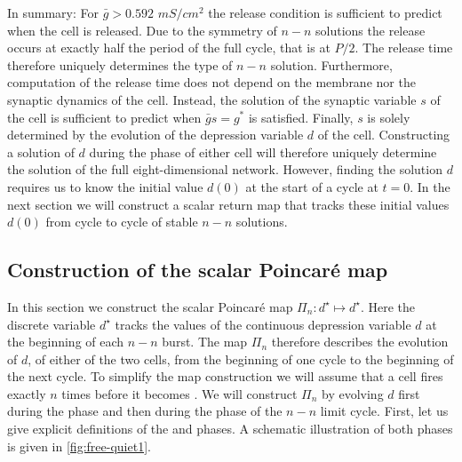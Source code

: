 In summary: For \(\bar g>0.592\) \(\si{mS/cm^{2}}\) the release condition is sufficient to predict when the \quiet{} cell is released.
Due to the symmetry of \(n-n\) solutions the release occurs at exactly half the period of the full cycle, that is at \(P/2\).
The release time therefore uniquely determines the type of \(n-n\) solution.
Furthermore, computation of the release time does not depend on the membrane nor the synaptic dynamics of the \quiet{} cell.
Instead, the solution of the synaptic variable \(s\) of the \free{} cell is sufficient to predict when \(\bar g s=g^{*}\) is satisfied.
Finally, \(s\) is solely determined by the evolution of the depression variable \(d\) of the \free{} cell.
Constructing a solution of \(d\) during the \free{} phase of either cell will therefore uniquely determine the solution of the full eight-dimensional network.
However, finding the solution \(d\) requires us to know the initial value \(d(0)\) at the start of a cycle at \(t=0\).
In the next section we will construct a scalar return map that tracks these initial values \(d(0)\) from cycle to cycle of stable \(n-n\) solutions.

\subsection{Construction of the scalar Poincaré map}
In this section we construct the scalar Poincaré map \(\Pi_n:d^{\star}\mapsto d^{\star}\).
Here the discrete variable \(d^{\star}\) tracks the values of the continuous depression variable \(d\) at the beginning of each \(n-n\) burst.
The map \(\Pi_n\) therefore describes the evolution of \(d\), of either of the two cells, from the beginning of one cycle to the beginning of the next cycle.
To simplify the map construction we will assume that a \free{} cell fires exactly \(n\) times before it becomes \quiet{}.
We will construct \(\Pi_n\) by evolving \(d\) first during the \free{} phase and then during the \quiet{} phase of the \(n-n\) limit cycle.
First, let us give explicit definitions of the \free{} and \quiet{} phases.
A schematic illustration of both phases is given in \cref{fig:free-quiet1}.

